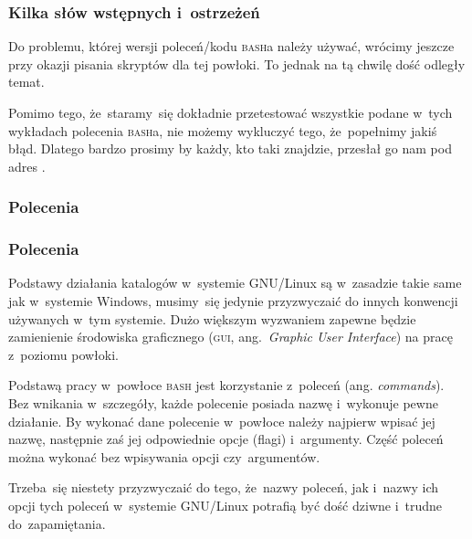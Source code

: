 \documentclass[10pt,t]{beamer}
\begin{document}
\begin{frame}
  \frametitle{Kilka słów wstępnych i~ostrzeżeń}


  Do problemu, której wersji poleceń/kodu \textsc{bash}a należy używać,
  wrócimy jeszcze przy okazji pisania skryptów dla tej powłoki. To jednak
  na tą chwilę dość odległy temat.

  Pomimo tego, że~staramy~się dokładnie przetestować wszystkie podane
  w~tych wykładach polecenia \textsc{bash}a, nie możemy wykluczyć tego,
  że~popełnimy jakiś błąd. Dlatego bardzo prosimy by każdy, kto taki
  znajdzie, przesłał go nam pod adres \email.

\end{frame}










\begin{frame}
  \frametitle{Polecenia}




\end{frame}





\begin{frame}
  \frametitle{Polecenia}


  Podstawy działania katalogów w~systemie GNU/Linux są w~zasadzie takie
  same jak w~systemie Windows, musimy~się jedynie przyzwyczaić do innych
  konwencji używanych w~tym systemie. Dużo większym wyzwaniem zapewne
  będzie zamienienie środowiska graficznego (\textsc{gui},
  ang.~\textit{Graphic User Interface}) na pracę z~poziomu powłoki.

  Podstawą pracy w~powłoce \textsc{bash} jest korzystanie z~poleceń (ang.
  \textit{commands}). Bez wnikania w~szczegóły, każde polecenie posiada
  nazwę i~wykonuje pewne działanie. By wykonać dane polecenie w~powłoce
  należy najpierw wpisać jej nazwę, następnie zaś jej odpowiednie
  opcje (flagi) i~argumenty. Część poleceń można wykonać bez wpisywania
  opcji czy~argumentów.

  Trzeba~się niestety przyzwyczaić do tego, że~nazwy poleceń, jak i~nazwy
  ich opcji tych poleceń w~systemie GNU/Linux potrafią być dość dziwne
  i~trudne do~zapamiętania.

\end{frame}
\end{document}

